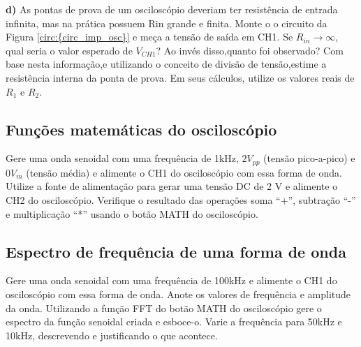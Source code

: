 \noindent \textbf{d)} As pontas de prova de um osciloscópio deveriam ter resistência de entrada infinita, mas na prática possuem Rin grande e
finita. Monte o o circuito da Figura \ref{circ:{circ_imp_osc}}  e meça a tensão de saída em CH1. Se $R_{in} \rightarrow \infty$, qual seria o valor esperado de $V_{CH1}$? Ao
invés disso,quanto foi observado? Com base nesta informação,e utilizando o conceito de divisão de tensão,estime a resistência
interna da ponta de prova. Em seus cálculos, utilize os valores reais de $R_1$ e $R_2$.


\subsection{Funções matemáticas do osciloscópio}

Gere uma onda senoidal com uma frequência de 1kHz, $2V_{pp}$ (tensão pico-a-pico) e $0V_m$ (tensão média) e alimente o CH1 do
osciloscópio com essa forma de onda. Utilize a fonte de alimentação para gerar uma tensão DC de 2 V e alimente o CH2 do
osciloscópio. Verifique o resultado das operações soma “+”, subtração “-” e multiplicação “*” usando o botão MATH do osciloscópio.

\subsection{Espectro de frequência de uma forma de onda}

Gere uma onda senoidal com uma frequência de 100kHz e alimente o CH1 do osciloscópio com essa forma de onda. Anote os
valores de frequência e amplitude da onda. Utilizando a função FFT do botão MATH do osciloscópio gere o espectro da função
senoidal criada e esboce-o. Varie a frequência para 50kHz e 10kHz, descrevendo e justificando o que acontece.